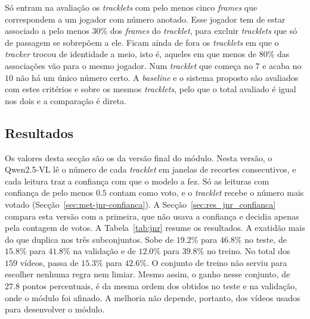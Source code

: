 Só entram na avaliação os \emph{tracklets} com pelo menos cinco \emph{frames} que correspondem a um jogador com número anotado. Esse jogador tem de estar associado a pelo menos $30\%$ dos \emph{frames} do \emph{tracklet}, para excluir \emph{tracklets} que só de passagem se sobrepõem a ele. Ficam ainda de fora os \emph{tracklets} em que o \emph{tracker} trocou de identidade a meio, isto é, aqueles em que menos de $80\%$ das associações vão para o mesmo jogador. Num \emph{tracklet} que começa no $7$ e acaba no $10$ não há um único número certo. A \emph{baseline} e o sistema proposto são avaliados com estes critérios e sobre os mesmos \emph{tracklets}, pelo que o total avaliado é igual nos dois e a comparação é direta.

\subsection{Resultados}\label{sec:res_jnr_resultados}

Os valores desta secção são os da versão final do módulo. Nesta versão, o Qwen2.5-VL lê o número de cada \emph{tracklet} em janelas de recortes consecutivos, e cada leitura traz a confiança com que o modelo a fez. Só as leituras com confiança de pelo menos $0.5$ contam como voto, e o \emph{tracklet} recebe o número mais votado (Secção~\ref{sec:met-jnr-confianca}). A Secção~\ref{sec:res_jnr_confianca} compara esta versão com a primeira, que não usava a confiança e decidia apenas pela contagem de votos. A Tabela~\ref{tab:jnr} resume os resultados. A exatidão mais do que duplica nos três subconjuntos. Sobe de $19.2\%$ para $46.8\%$ no teste, de $15.8\%$ para $41.8\%$ na validação e de $12.0\%$ para $39.8\%$ no treino. No total dos $159$ vídeos, passa de $15.3\%$ para $42.6\%$. O conjunto de treino não serviu para escolher nenhuma regra nem limiar. Mesmo assim, o ganho nesse conjunto, de $27.8$ pontos percentuais, é da mesma ordem dos obtidos no teste e na validação, onde o módulo foi afinado. A melhoria não depende, portanto, dos vídeos usados para desenvolver o módulo.

